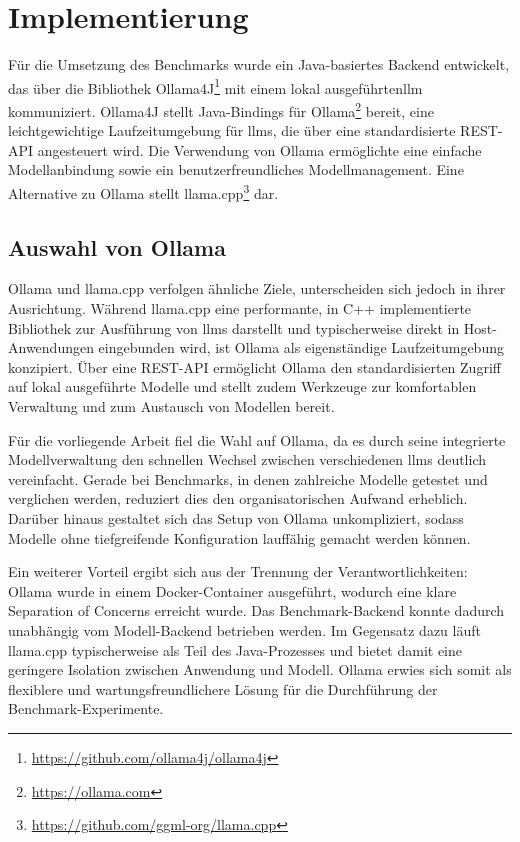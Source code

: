 \section{Implementierung}\label{sec:benchmark-implementierung}

Für die Umsetzung des Benchmarks wurde ein Java-basiertes Backend entwickelt, das über die Bibliothek Ollama4J\footnote{\url{https://github.com/ollama4j/ollama4j}} mit einem lokal ausgeführten\gls{llm} kommuniziert.
Ollama4J stellt Java-Bindings für Ollama\footnote{\url{https://ollama.com}} bereit, eine leichtgewichtige Laufzeitumgebung für \glspl{llm}, die über eine standardisierte REST-API angesteuert wird.
Die Verwendung von Ollama ermöglichte eine einfache Modellanbindung sowie ein benutzerfreundliches Modellmanagement.
Eine Alternative zu Ollama stellt llama.cpp\footnote{\url{https://github.com/ggml-org/llama.cpp}} dar.


\subsection{Auswahl von Ollama}\label{subsec:auswahl-von-ollama}

Ollama und llama.cpp verfolgen ähnliche Ziele, unterscheiden sich jedoch in ihrer Ausrichtung.
Während llama.cpp eine performante, in C++ implementierte Bibliothek zur Ausführung von \glspl{llm} darstellt und typischerweise direkt in Host-Anwendungen eingebunden wird, ist Ollama als eigenständige Laufzeitumgebung konzipiert.
Über eine REST-API ermöglicht Ollama den standardisierten Zugriff auf lokal ausgeführte Modelle und stellt zudem Werkzeuge zur komfortablen Verwaltung und zum Austausch von Modellen bereit.

Für die vorliegende Arbeit fiel die Wahl auf Ollama, da es durch seine integrierte Modellverwaltung den schnellen Wechsel zwischen verschiedenen \glspl{llm} deutlich vereinfacht.
Gerade bei Benchmarks, in denen zahlreiche Modelle getestet und verglichen werden, reduziert dies den organisatorischen Aufwand erheblich.
Darüber hinaus gestaltet sich das Setup von Ollama unkompliziert, sodass Modelle ohne tiefgreifende Konfiguration lauffähig gemacht werden können.

Ein weiterer Vorteil ergibt sich aus der Trennung der Verantwortlichkeiten: Ollama wurde in einem Docker-Container ausgeführt, wodurch eine klare Separation of Concerns erreicht wurde.
Das Benchmark-Backend konnte dadurch unabhängig vom Modell-Backend betrieben werden.
Im Gegensatz dazu läuft llama.cpp typischerweise als Teil des Java-Prozesses und bietet damit eine geringere Isolation zwischen Anwendung und Modell.
Ollama erwies sich somit als flexiblere und wartungsfreundlichere Lösung für die Durchführung der Benchmark-Experimente.


